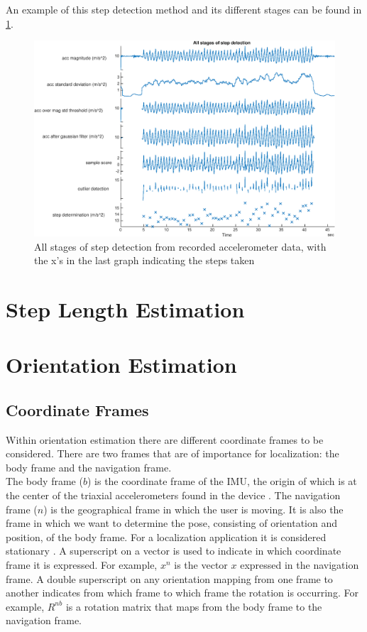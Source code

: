 An example of this step detection method and its different stages can be found in \cref{fig:all_stages_of_step_detection}.

\begin{figure}[H]
	\centering
	\includegraphics[width=1\linewidth]{images/20200924_1204_All_stages_of_step_detection}
	\caption{All stages of step detection from recorded accelerometer data, with the x's in the last graph indicating the steps taken }
	\label{fig:all_stages_of_step_detection}
\end{figure}

\section{Step Length Estimation}

\section{Orientation Estimation}
\subsection{Coordinate Frames}
Within orientation estimation there are  different coordinate frames to be considered. There are two frames that are of importance for localization: the body frame and the navigation frame.\\
The body frame ($b$) is the coordinate frame of the IMU, the origin of which is at the center of the triaxial accelerometers found in the device \cite{Kok2017}. The navigation frame ($n$) is the geographical frame in which the user is moving. It is also the frame in which we want to determine the pose, consisting of orientation and position, of the body frame. For a localization application it is considered stationary \cite{Kok2017}.
A superscript on a vector is used to indicate in which coordinate frame it is expressed. For example,
$x^n$ is the vector $x$ expressed in the navigation frame. A double superscript on any orientation mapping from one frame to another indicates from which frame to which frame the rotation is occurring. For example,
$R^{nb}$ is a rotation matrix that maps from the body frame to the navigation frame.


